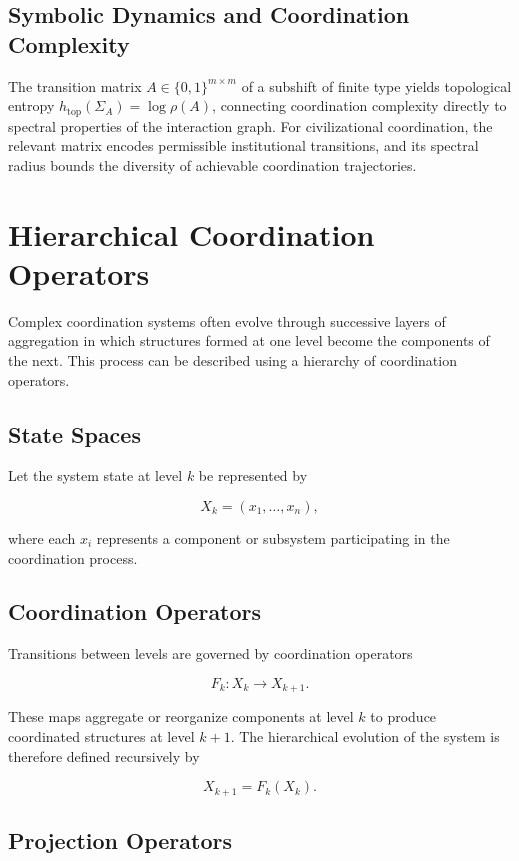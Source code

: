 \documentclass[12pt]{article}
\begin{document}
\subsection{Symbolic Dynamics and Coordination Complexity}

The transition matrix $A \in \{0,1\}^{m \times m}$ of a subshift of finite type yields topological entropy $h_{\mathrm{top}}(\Sigma_A) = \log\rho(A)$, connecting coordination complexity directly to spectral properties of the interaction graph. For civilizational coordination, the relevant matrix encodes permissible institutional transitions, and its spectral radius bounds the diversity of achievable coordination trajectories.

\newpage

\section{Hierarchical Coordination Operators}

Complex coordination systems often evolve through successive layers of aggregation in which structures formed at one level become the components of the next. This process can be described using a hierarchy of coordination operators.

\subsection{State Spaces}

Let the system state at level $k$ be represented by

\[
X_k = (x_1,\dots,x_n),
\]

where each $x_i$ represents a component or subsystem participating in the coordination process.

\subsection{Coordination Operators}

Transitions between levels are governed by coordination operators

\[
F_k : X_k \rightarrow X_{k+1}.
\]

These maps aggregate or reorganize components at level $k$ to produce coordinated structures at level $k+1$. The hierarchical evolution of the system is therefore defined recursively by

\[
X_{k+1} = F_k(X_k).
\]

\subsection{Projection Operators}
\end{document}
